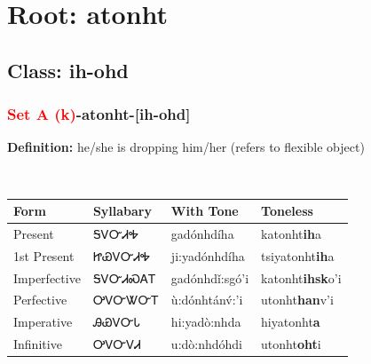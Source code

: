 \needspace{4in}
\section*{Root: atonht}
\nopagebreak
{}
\needspace{3in}
\subsection*{Class: ih-ohd}
\nopagebreak
\needspace{2in}
\subsubsection*{\textcolor{Red}{Set A (k)}{-}\textbf{atonht}{-}[ih-ohd]}
\nopagebreak
\textbf{Definition: } he/she is dropping him/her (refers to flexible object)
\\[0.5em]
\begin{tabularx}{\textwidth}{l X X X}%
\toprule%
\textbf{Form}&\textbf{Syllabary}&\textbf{With Tone}&\textbf{Toneless}\\%
\midrule%
Present&ᎦᏙᏅᏗᎭ&gadónhdíha&katonht\textbf{ih}a\\%
1st Present&ᏥᏯᏙᏅᏗᎭ&ji:yadónhdíha&tsiyatonht\textbf{ih}a\\%
Imperfective&ᎦᏙᏅᏗᏍᎪᎢ&gadónhdǐ:sgó’i&katonht\textbf{ihsk}o'i\\%
Perfective&ᎤᏙᏅᏔᏅᎢ&ù:dónhtánv́:’i&utonht\textbf{han}v'i\\%
Imperative&ᎯᏯᏙᏅᏓ&hi:yadò:nhda&hiyatonht\textbf{a}\\%
Infinitive&ᎤᏙᏅᏙᏗ&u:dò:nhdóhdi&utonht\textbf{oht}i\\%
\bottomrule%
\end{tabularx}
\\[1em]
